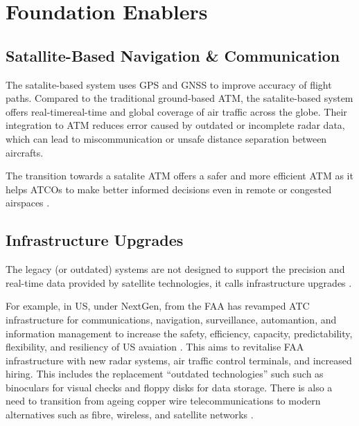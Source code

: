 \section{Foundation Enablers}






\subsection{Satallite-Based Navigation \& Communication}

The satalite-based system uses \gls{GPS} and \gls{GNSS} to improve accuracy of flight paths. 
Compared to the traditional ground-based \gls{ATM}, the satalite-based system offers real-timereal-time and global coverage of air traffic across the globe. 
Their integration to \gls{ATM} reduces error caused by outdated or incomplete radar data, which can lead to miscommunication or unsafe distance separation between aircrafts.

The transition towards a satalite \gls{ATM} offers a safer and more efficient \gls{ATM} as it helps \glspl{ATCO} to make better informed decisions even in remote or congested airspaces \cite{atmexcite2025satellite}.



\subsection{Infrastructure Upgrades}

The legacy (or outdated) systems are not designed to support the precision and real-time data provided by satellite technologies, it calls infrastructure upgrades \cite{atmexcite2025satellite}. 

For example, in \gls{US}, under \gls{NextGen}, from the \gls{FAA} has revamped \gls{ATC} infrastructure for communications, navigation, surveillance, automantion, and information management to increase the safety, efficiency, capacity, predictability, flexibility, and resiliency of \gls{US} avaiation \cite{faa_nextgen}. 
This aims to revitalise \gls{FAA} infrastructure with new radar systems, air traffic control terminals, and increased hiring. 
This includes the replacement ``outdated technologies'' such such as binoculars for visual checks and floppy disks for data storage.
There is also a need to transition from ageing copper wire telecommunications to modern alternatives such as fibre, wireless, and satellite networks \cite{airporttech_us_upgrade}.





